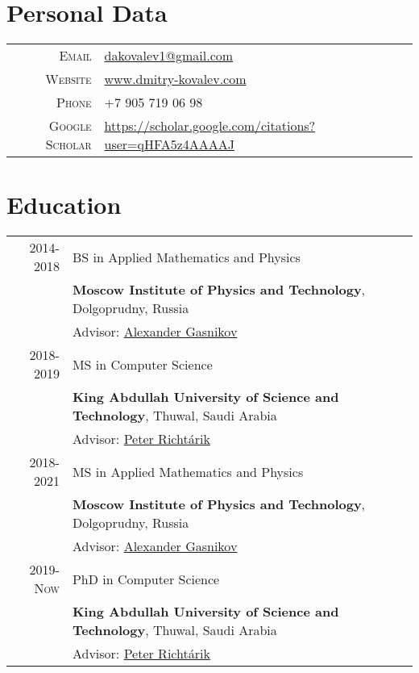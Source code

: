 \section{Personal Data}

\begin{tabular}{rl}
	\textsc{Email} & \href{mailto:dakovalev1@gmail.com}{dakovalev1@gmail.com}\\
	\textsc{Website} & \href{https://www.dmitry-kovalev.com}{www.dmitry-kovalev.com}\\
	\textsc{Phone} & +7 905 719 06 98\\
	\textsc{Google Scholar} &\href{https://scholar.google.com/citations?user=qHFA5z4AAAAJ}{https://scholar.google.com/citations?user=qHFA5z4AAAAJ}
\end{tabular}



\section{Education}
\begin{tabular}{rl}	
	\textsc{2014-2018}& BS in Applied Mathematics and Physics\\
	& \textbf{Moscow Institute of Physics and Technology}, Dolgoprudny, Russia\\
	& Advisor: \href{https://scholar.google.com/citations?user=AmeE8qkAAAAJ}{Alexander Gasnikov}\\
	\textsc{2018-2019}& MS in Computer Science\\
	& \textbf{King Abdullah University of Science and Technology}, Thuwal, Saudi Arabia\\
	& Advisor: \href{https://richtarik.org}{Peter Richt\'{a}rik}\\
	\textsc{2018-2021}& MS in Applied Mathematics and Physics\\
	& \textbf{Moscow Institute of Physics and Technology}, Dolgoprudny, Russia\\
	& Advisor: \href{https://scholar.google.com/citations?user=AmeE8qkAAAAJ}{Alexander Gasnikov}\\
	\textsc{2019-Now}& PhD in Computer Science\\
	& \textbf{King Abdullah University of Science and Technology}, Thuwal, Saudi Arabia\\
	& Advisor: \href{https://richtarik.org}{Peter Richt\'{a}rik}\\
\end{tabular}

